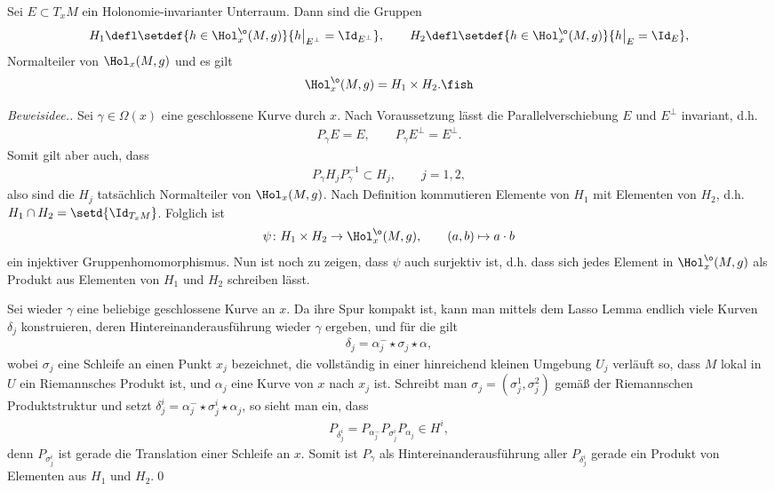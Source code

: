 \documentclass[%
	paper=a5,%
	fleqn,%
	DIV=18,%
	BCOR=0mm,
	fontsize=11pt,
	titlepage=false,%
	bibliography=totoc,
	DIV=18,%
	twoside=true,
	pdftitle=Riemannsche Geometrie,
	pdfauthor=Uwe Semmelmann,
	numbers=noendperiod]%
	{scrbook}
\begin{document}
\begin{prop}
Sei $E\subset T_{x}M$ ein Holonomie-invarianter Unterraum. Dann sind die Gruppen
\begin{align*}
H_{1} \defl \setdef{h\in \Hol_{x}^\o(M,g)}{h\big|_{E^\bot} = \Id_{E^\bot}},\qquad
H_{2} \defl \setdef{h\in \Hol_{x}^\o(M,g)}{h\big|_{E} = \Id_{E}},
\end{align*}
Normalteiler von $\Hol_{x}(M,g)$ und es gilt
\begin{align*}
\Hol_{x}^\o(M,g) = H_{1}\times H_{2}.\fish
\end{align*}
\end{prop}
\begin{proof}[Beweisidee.]
Sei $\gamma\in\Omega(x)$ eine geschlossene Kurve durch $x$. Nach Voraussetzung lässt die Parallelverschiebung $E$ und $E^\bot$ invariant, d.h.
\begin{align*}
P_{\gamma}E = E,\qquad P_{\gamma}E^\bot = E^\bot.
\end{align*}
Somit gilt aber auch, dass
\begin{align*}
P_{\gamma} H_{j} P_{\gamma}^{-1} \subset H_{j},\qquad j=1,2,
\end{align*}
also sind die $H_{j}$ tatsächlich Normalteiler von $\Hol_{x}(M,g)$. Nach Definition kommutieren Elemente von $H_{1}$ mit Elementen von $H_{2}$, d.h. $H_{1}\cap H_{2} = \setd{\Id_{T_{x}M}}$. Folglich ist
\begin{align*}
\psi\colon H_{1}\times H_{2}\to \Hol_{x}^\o(M,g),\qquad (a,b)\mapsto a\cdot b
\end{align*}
ein injektiver Gruppenhomomorphismus. Nun ist noch zu zeigen, dass $\psi$ auch surjektiv ist, d.h. dass sich jedes Element in $\Hol_{x}^\o(M,g)$ als Produkt aus Elementen von $H_{1}$ und $H_{2}$ schreiben lässt.

Sei wieder $\gamma$ eine beliebige geschlossene Kurve an $x$. 
Da ihre Spur kompakt ist, kann man mittels dem Lasso Lemma endlich viele Kurven $\delta_{j}$ konstruieren, deren Hintereinanderausführung wieder $\gamma$ ergeben, und für die gilt
\begin{align*}
\delta_{j} = \alpha_{j}^- \star \sigma_{j}\star \alpha,
\end{align*}
wobei $\sigma_{j}$ eine Schleife an einen Punkt $x_{j}$ bezeichnet, die vollständig in einer hinreichend kleinen Umgebung $U_{j}$ verläuft so, dass $M$ lokal in $U$ ein Riemannsches Produkt ist, und $\alpha_{j}$ eine Kurve von $x$ nach $x_{j}$ ist.
Schreibt man $\sigma_{j}=(\sigma_{j}^1,\sigma_{j}^2)$ gemäß der Riemannschen Produktstruktur und setzt $\delta_{j}^i = \alpha_{j}^-\star \sigma_{j}^i\star \alpha_{j}$, so sieht man ein, dass
\begin{align*}
P_{\delta_{j}^i} = P_{\alpha_{j}^{-}}P_{\sigma_{j}^i}P_{\alpha_{j}} \in H^i,
\end{align*}
denn $P_{\sigma_{j}^i}$ ist gerade die Translation einer Schleife an $x$. Somit
ist $P_{\gamma}$ als Hintereinanderausführung aller $P_{\delta_{j}^i}$ gerade ein Produkt von Elementen aus $H_1$ und $H_2$.\qed
\end{proof}
\end{document}
